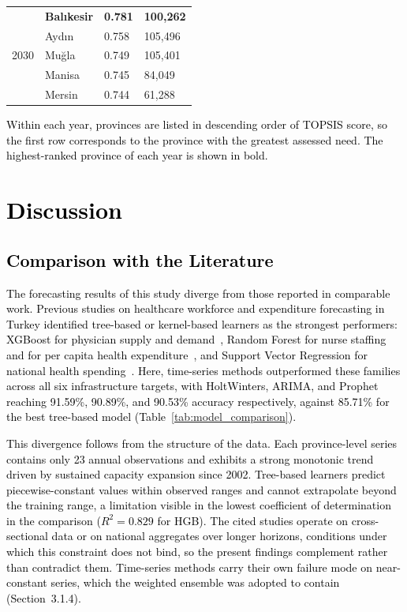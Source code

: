 \documentclass[final, 9pt, twocolumn]{saucis}
\newcommand{\rev}[1]{\textcolor{black}{#1}}
\begin{document}
\begin{table}[ht]
\begin{threeparttable}
\begin{tabular}{p{0.6cm} p{1.5cm} p{1.7cm} p{2.2cm}}
\hline
\multirow{5}{*}{2030}
 & \textbf{Balıkesir} & \textbf{0.781} & \textbf{100{,}262} \\
 & Aydın     & 0.758 & 105{,}496 \\
 & Muğla     & 0.749 & 105{,}401 \\
 & Manisa    & 0.745 & 84{,}049 \\
 & Mersin    & 0.744 & 61{,}288 \\
\hline
\end{tabular}
\begin{tablenotes}
\footnotesize
\item \rev{Within each year, provinces are listed in descending order of TOPSIS score, so the first row corresponds to the province with the greatest assessed need. The highest-ranked province of each year is shown in bold.}
\end{tablenotes}
\end{threeparttable}
\end{table}

\section{\rev{Discussion}}
\subsection{\rev{Comparison with the Literature}}

\rev{The forecasting results of this study diverge from those reported in
comparable work. Previous studies on healthcare workforce and expenditure
forecasting in Turkey identified tree-based or kernel-based learners as the
strongest performers: XGBoost for physician supply and demand~\cite{intro8},
Random Forest for nurse staffing~\cite{intro9} and for per capita health
expenditure~\cite{intro11}, and Support Vector Regression for national health
spending~\cite{intro12}. Here, time-series methods outperformed these families
across all six infrastructure targets, with HoltWinters, ARIMA, and Prophet
reaching 91.59\%, 90.89\%, and 90.53\% accuracy respectively, against 85.71\%
for the best tree-based model (Table~\ref{tab:model_comparison}).}

\rev{This divergence follows from the structure of the data. Each province-level
series contains only 23 annual observations and exhibits a strong monotonic
trend driven by sustained capacity expansion since 2002. Tree-based learners
predict piecewise-constant values within observed ranges and cannot extrapolate
beyond the training range, a limitation visible in the lowest coefficient of
determination in the comparison ($R^{2} = 0.829$ for HGB). The cited studies
operate on cross-sectional data or on national aggregates over longer horizons,
conditions under which this constraint does not bind, so the present findings
complement rather than contradict them. Time-series methods carry their own
failure mode on near-constant series, which the weighted ensemble was adopted to
contain (Section~3.1.4).}
\end{document}
